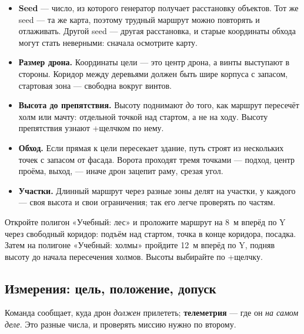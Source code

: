 \begin{itemize}
    \item \textbf{Seed} --- число, из которого генератор получает расстановку объектов. Тот же seed --- та же карта, поэтому трудный маршрут можно повторять и отлаживать. Другой seed --- другая расстановка, и старые координаты обхода могут стать неверными: сначала осмотрите карту.
    \item \textbf{Размер дрона.} Координаты цели --- это центр дрона, а винты выступают в стороны. Коридор между деревьями должен быть шире корпуса с запасом, стартовая зона --- свободна вокруг винтов.
    \item \textbf{Высота до препятствия.} Высоту поднимают \emph{до} того, как маршрут пересечёт холм или мачту: отдельной точкой над стартом, а не на ходу. Высоту препятствия узнают +щелчком по нему.
    \item \textbf{Обход.} Если прямая к цели пересекает здание, путь строят из нескольких точек с запасом от фасада. Ворота проходят тремя точками --- подход, центр проёма, выход, --- иначе дрон зацепит раму, срезая угол.
    \item \textbf{Участки.} Длинный маршрут через разные зоны делят на участки, у каждого --- своя высота и свои ограничения; так его легче проверять по частям.
\end{itemize}

\begin{taskbox}
Откройте полигон «Учебный: лес» и проложите маршрут на 8~м вперёд по Y через свободный коридор: подъём над стартом, точка в конце коридора, посадка. Затем на полигоне «Учебный: холмы» пройдите 12~м вперёд по Y, подняв высоту до начала пересечения холмов. Высоты выбирайте по +щелчку.
\end{taskbox}

\subsection{Измерения: цель, положение, допуск}

Команда сообщает, куда дрон \emph{должен} прилететь; \textbf{телеметрия} --- где он \emph{на самом деле}. Это разные числа, и проверять миссию нужно по второму.


